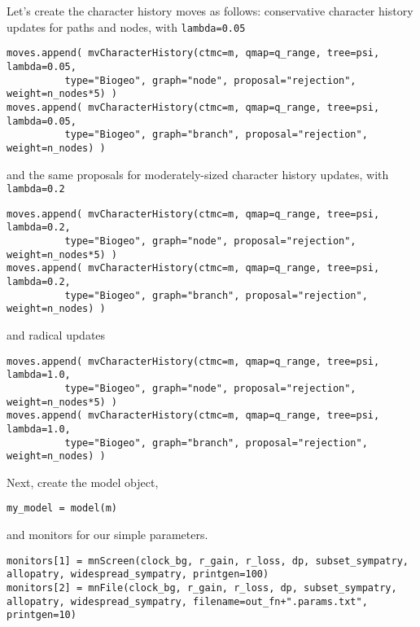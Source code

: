 Let's create the character history moves as follows: conservative character history updates for paths and nodes, with {\tt lambda=0.05}

\begin{snugshade}
\begin{lstlisting}
moves.append( mvCharacterHistory(ctmc=m, qmap=q_range, tree=psi, lambda=0.05, 
          type="Biogeo", graph="node", proposal="rejection", weight=n_nodes*5) )
moves.append( mvCharacterHistory(ctmc=m, qmap=q_range, tree=psi, lambda=0.05, 
          type="Biogeo", graph="branch", proposal="rejection", weight=n_nodes) )
\end{lstlisting}
\end{snugshade}

and the same proposals for moderately-sized character history updates, with {\tt lambda=0.2}

\begin{snugshade}
\begin{lstlisting}
moves.append( mvCharacterHistory(ctmc=m, qmap=q_range, tree=psi, lambda=0.2, 
          type="Biogeo", graph="node", proposal="rejection", weight=n_nodes*5) )
moves.append( mvCharacterHistory(ctmc=m, qmap=q_range, tree=psi, lambda=0.2, 
          type="Biogeo", graph="branch", proposal="rejection", weight=n_nodes) )
\end{lstlisting}
\end{snugshade}

and radical updates

\begin{snugshade}
\begin{lstlisting}
moves.append( mvCharacterHistory(ctmc=m, qmap=q_range, tree=psi, lambda=1.0, 
          type="Biogeo", graph="node", proposal="rejection", weight=n_nodes*5) )
moves.append( mvCharacterHistory(ctmc=m, qmap=q_range, tree=psi, lambda=1.0, 
          type="Biogeo", graph="branch", proposal="rejection", weight=n_nodes) )
\end{lstlisting}
\end{snugshade}


Next, create the model object,

\begin{snugshade}
\begin{lstlisting}
my_model = model(m)
\end{lstlisting}
\end{snugshade}

and monitors for our simple parameters.

\begin{snugshade}
\begin{lstlisting}
monitors[1] = mnScreen(clock_bg, r_gain, r_loss, dp, subset_sympatry, allopatry, widespread_sympatry, printgen=100)
monitors[2] = mnFile(clock_bg, r_gain, r_loss, dp, subset_sympatry, allopatry, widespread_sympatry, filename=out_fn+".params.txt", printgen=10)
\end{lstlisting}
\end{snugshade}

